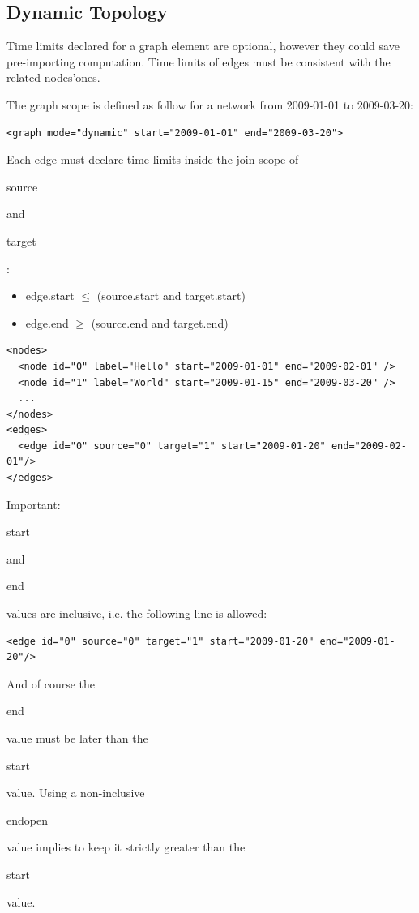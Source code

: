 \documentclass[a4paper,10pt]{article}
\begin{document}
\subsection{Dynamic Topology}

Time limits declared for a graph element are optional, however they could save pre-importing computation. Time limits of edges must be consistent with the related nodes'ones.

The graph scope is defined as follow for a network from 2009-01-01 to 2009-03-20:

\lstset{ style=gexf }
\begin{lstlisting}[caption={Graph Scope Example}]
<graph mode="dynamic" start="2009-01-01" end="2009-03-20">
\end{lstlisting}

Each edge must declare time limits inside the join scope of \begin{footnotesize}source\end{footnotesize} and \begin{footnotesize}target\end{footnotesize}:
\begin{itemize}
 \item edge.start $\le$ (source.start and target.start)
 \item edge.end   $\ge$ (source.end   and target.end)
\end{itemize}

\lstset{ style=gexf }
\begin{lstlisting}[caption={Edge Scope Example}]
<nodes>
  <node id="0" label="Hello" start="2009-01-01" end="2009-02-01" />
  <node id="1" label="World" start="2009-01-15" end="2009-03-20" />
  ...
</nodes>
<edges>
  <edge id="0" source="0" target="1" start="2009-01-20" end="2009-02-01"/>
</edges>
\end{lstlisting}

Important: \begin{footnotesize}start\end{footnotesize} and \begin{footnotesize}end\end{footnotesize} values are inclusive, i.e. the following line is allowed:

\lstset{ style=gexf }
\begin{lstlisting}[caption={Smallest time scope}]
<edge id="0" source="0" target="1" start="2009-01-20" end="2009-01-20"/>
\end{lstlisting}

And of course the \begin{footnotesize}end\end{footnotesize} value must be later than the \begin{footnotesize}start\end{footnotesize} value. Using a non-inclusive \begin{footnotesize}endopen\end{footnotesize} value implies to keep it strictly greater than the \begin{footnotesize}start\end{footnotesize} value.
\end{document}
